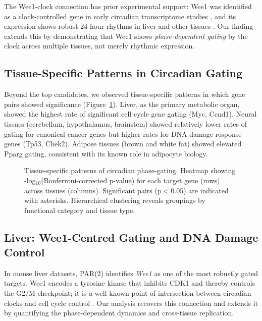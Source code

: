 \documentclass[11pt,a4paper]{article}
\begin{document}
The Wee1-clock connection has prior experimental support: Wee1 was identified as a clock-controlled gene in early circadian transcriptome studies \citep{matsuo2003control}, and its expression shows robust 24-hour rhythms in liver and other tissues \citep{sato2009circadian}. Our finding extends this by demonstrating that Wee1 shows \textit{phase-dependent gating} by the clock across multiple tissues, not merely rhythmic expression.

\subsection{Tissue-Specific Patterns in Circadian Gating}

Beyond the top candidates, we observed tissue-specific patterns in which gene pairs showed significance (Figure~\ref{fig:heatmap}). Liver, as the primary metabolic organ, showed the highest rate of significant cell cycle gene gating (Myc, Ccnd1). Neural tissues (cerebellum, hypothalamus, brainstem) showed relatively lower rates of gating for canonical cancer genes but higher rates for DNA damage response genes (Tp53, Chek2). Adipose tissues (brown and white fat) showed elevated Pparg gating, consistent with its known role in adipocyte biology.

\begin{figure}[H]
\centering
{}
\caption{Tissue-specific patterns of circadian phase-gating. Heatmap showing -log$_{10}$(Bonferroni-corrected p-value) for each target gene (rows) across tissues (columns). Significant pairs (p$<$0.05) are indicated with asterisks. Hierarchical clustering reveals groupings by functional category and tissue type.}
\label{fig:heatmap}
\end{figure}

\subsection{Liver: Wee1-Centred Gating and DNA Damage Control}

In mouse liver datasets, PAR(2) identifies \textit{Wee1} as one of the most robustly gated targets. Wee1 encodes a tyrosine kinase that inhibits CDK1 and thereby controls the G2/M checkpoint; it is a well-known point of intersection between circadian clocks and cell cycle control \citep{matsuo2003control}. Our analysis recovers this connection and extends it by quantifying the phase-dependent dynamics and cross-tissue replication.
\end{document}
